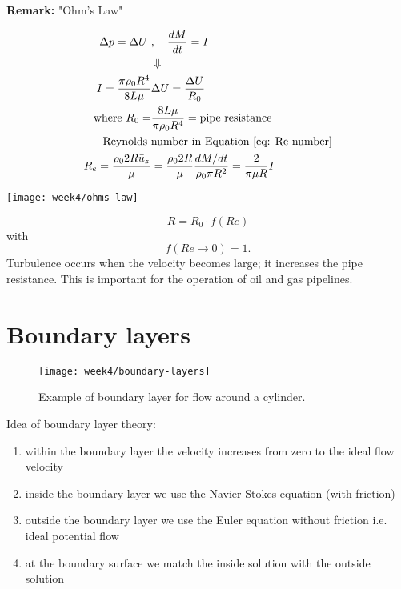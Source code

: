 \begin{framed}
\textbf{Remark:} "Ohm's Law"

\begin{align}
\Delta p = \Delta U \ &,\quad \frac{d M}{d t} = I\\
&\Downarrow\notag\\
I = \frac{\pi\rho_0 R^4}{8L\mu} & \Delta U = \frac{\Delta U}{R_0}\\
\text{where } R_0 = &\frac{8L\mu}{\pi\rho_0 R^4}=\text{pipe resistance}\\
\text{Reynolds } & \text{number in Equation \ref{eq: Re number}} \\
R_e =  \frac{\rho_0 2R \bar{u}_z}{\mu} & = \frac{\rho_0 2R }{\mu} \frac{dM/dt}{\rho_0\pi R^2} = \frac{2}{\pi\mu R}I\\
\end{align}

{\center
\texttt{[image: week4/ohms-law]}\\
}

\begin{equation}
R = R_0\cdot f(Re)
\end{equation}
with
\begin{equation}
f(Re\rightarrow0)=1.
\end{equation}
Turbulence occurs when the velocity becomes large; it increases the pipe resistance. This is important for the operation of oil and gas pipelines.
\end{framed}



\newpage
\section{Boundary layers}

\begin{figure}[ht]
    \centering
    \texttt{[image: week4/boundary-layers]}\\
    \caption{Example of boundary layer for flow around a cylinder.}
    \label{fig:boundary-layers}
\end{figure}

Idea of boundary layer theory:
\begin{enumerate}
\item within the boundary layer the velocity increases from zero to the ideal flow velocity
\item inside the boundary layer we use the Navier-Stokes equation (with friction)
\item outside the boundary layer we use the Euler equation without friction i.e. ideal potential flow
\item at the boundary surface we match the inside solution with the outside solution
\end{enumerate}

